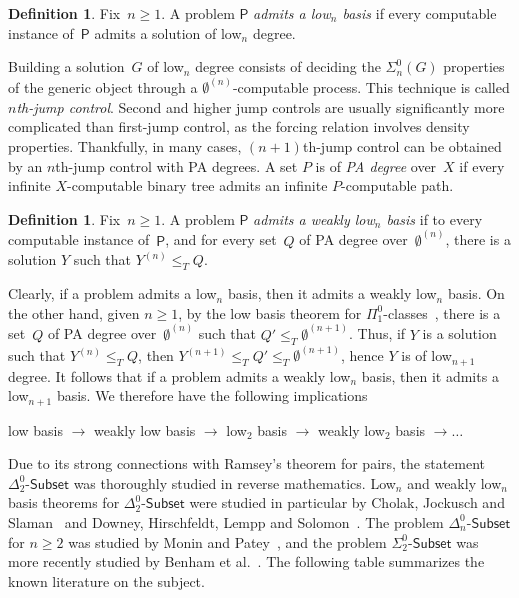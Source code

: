 \documentclass{article}
\def\Psf{\mathsf{P}}
\newcommand{\Sub}[1]{{#1}\mbox{-}\mathsf{Subset}}
\numberwithin{theorem}{section}
\theoremstyle{definition}
\newtheorem{definition}[theorem]{Definition}
\begin{document}
\begin{definition}
Fix~$n \geq 1$. A problem $\Psf$ \emph{admits a low${}_n$ basis} if every computable instance of~$\Psf$ admits a solution of low${}_n$ degree. 
\end{definition}

Building a solution~$G$ of low${}_n$ degree consists of deciding the $\Sigma^0_n(G)$ properties of the generic object through a $\emptyset^{(n)}$-computable process. This technique is called \emph{$n$th-jump control}. Second and higher jump controls are usually significantly more complicated than first-jump control, as the forcing relation involves density properties. Thankfully, in many cases, $(n+1)$th-jump control can be obtained by an $n$th-jump control with PA degrees. A set $P$ is of \emph{PA degree} over~$X$ if every infinite $X$-computable binary tree admits an infinite $P$-computable path.

\begin{definition}
Fix~$n \geq 1$. A problem $\Psf$ \emph{admits a weakly low${}_n$ basis} if to every computable instance of~$\Psf$, and for every set~$Q$ of PA degree over~$\emptyset^{(n)}$, there is a solution $Y$ such that $Y^{(n)} \leq_T Q$.
\end{definition}

Clearly, if a problem admits a low${}_n$ basis, then it admits a weakly low${}_n$ basis.
On the other hand, given $n \geq 1$, by the low basis theorem for $\Pi^0_1$-classes~\cite{jockusch1972classes}, there is a set~$Q$ of PA degree over~$\emptyset^{(n)}$ such that $Q' \leq_T \emptyset^{(n+1)}$. Thus, if $Y$ is a solution such that $Y^{(n)} \leq_T Q$, then $Y^{(n+1)} \leq_T Q' \leq_T \emptyset^{(n+1)}$, hence $Y$ is of low${}_{n+1}$ degree. It follows that if a problem admits a weakly low${}_n$ basis, then it admits a low${}_{n+1}$ basis. We therefore have the following implications
\begin{center}
low basis $\rightarrow$ weakly low basis $\rightarrow$ low${}_2$ basis $\rightarrow$ weakly low${}_2$ basis $\rightarrow \dots$ 
\end{center}


Due to its strong connections with Ramsey's theorem for pairs, the statement $\Sub{\Delta^0_2}$ was thoroughly studied in reverse mathematics. Low${}_n$ and weakly low${}_n$ basis theorems for $\Sub{\Delta^0_2}$ were studied in particular by Cholak, Jockusch and Slaman~\cite{cholak2001strength} and Downey, Hirschfeldt, Lempp and Solomon~\cite{downey2001delta2}. The problem $\Sub{\Delta^0_n}$ for $n \geq 2$ was studied by Monin and Patey~\cite{monin2021weakness}, and the problem $\Sub{\Sigma^0_2}$ was more recently studied by Benham et al.~\cite{benham2024ginsburg}. The following table summarizes the known literature on the subject.
\end{document}
